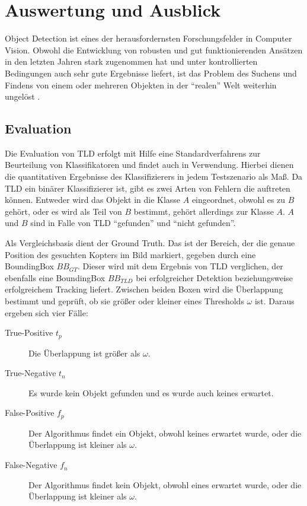 \section{Auswertung und Ausblick}
	Object Detection ist eines der herausfordernsten Forschungsfelder in Computer Vision. Obwohl die Entwicklung von robusten und gut funktionierenden Ansätzen in den letzten Jahren stark zugenommen hat und unter kontrollierten Bedingungen auch sehr gute Ergebnisse liefert, ist das Problem des Suchens und Findens von einem oder mehreren Objekten in der ``realen'' Welt weiterhin ungelöst \cite{ODS}.

\subsection{Evaluation}
	Die Evaluation von TLD erfolgt mit Hilfe eine Standardverfahrens zur Beurteilung von Klassifikatoren und findet auch in \cite{TLD} Verwendung. Hierbei dienen die quantitativen Ergebnisse des Klassifizierers in jedem Testszenario als Maß. Da TLD ein binärer Klassifizierer ist, gibt es zwei Arten von Fehlern die auftreten können. Entweder wird das Objekt in die Klasse $A$ eingeordnet, obwohl es zu $B$ gehört, oder es wird als Teil von $B$ bestimmt, gehört allerdings zur Klasse $A$. $A$ und $B$ sind in Falle von TLD ``gefunden'' und ``nicht gefunden''.

	Als Vergleichsbasis dient der Ground Truth. Das ist der Bereich, der die genaue Position des gesuchten Kopters im Bild markiert, gegeben durch eine BoundingBox $BB_{GT}$. Dieser wird mit dem Ergebnis von TLD verglichen, der ebenfalls eine BoundingBox $BB_{TLD}$ bei erfolgreicher Detektion beziehungsweise erfolgreichem Tracking liefert. Zwischen beiden Boxen wird die Überlappung bestimmt und geprüft, ob sie größer oder kleiner eines Thresholds $\omega$ ist. Daraus ergeben sich vier Fälle:

	\begin{description}
		\item [True-Positive $t_p$] Die Überlappung ist größer als $\omega$.
		\item [True-Negative $t_n$] Es wurde kein Objekt gefunden und es wurde auch keines erwartet.
		\item [False-Positive $f_p$] Der Algorithmus findet ein Objekt, obwohl keines erwartet wurde, oder die Überlappung ist kleiner als $\omega$.
		\item [False-Negative $f_n$] Der Algorithmus findet kein Objekt, obwohl eines erwartet wurde, oder die Überlappung ist kleiner als $\omega$.
	\end{description}

